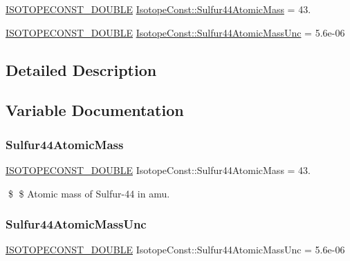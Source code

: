 \begin{DoxyCompactItemize}
\item 
\mbox{\hyperlink{group___isotope_const-_macros_ga8f45a7272ce02c0b4c65c44636ed719a}{I\+S\+O\+T\+O\+P\+E\+C\+O\+N\+S\+T\+\_\+\+D\+O\+U\+B\+LE}} \mbox{\hyperlink{group___isotope_const-_sulfur-_s44_ga752f3c0a12508d487f1f331ad47aec47}{Isotope\+Const\+::\+Sulfur44\+Atomic\+Mass}} = 43.
\item 
\mbox{\hyperlink{group___isotope_const-_macros_ga8f45a7272ce02c0b4c65c44636ed719a}{I\+S\+O\+T\+O\+P\+E\+C\+O\+N\+S\+T\+\_\+\+D\+O\+U\+B\+LE}} \mbox{\hyperlink{group___isotope_const-_sulfur-_s44_gabe445e37c9fd6b352b685fcfdad32e4a}{Isotope\+Const\+::\+Sulfur44\+Atomic\+Mass\+Unc}} = 5.\+6e-\/06
\end{DoxyCompactItemize}


\subsection{Detailed Description}


\subsection{Variable Documentation}
\mbox{\label{group___isotope_const-_sulfur-_s44_ga752f3c0a12508d487f1f331ad47aec47}} 
\subsubsection{\texorpdfstring{Sulfur44\+Atomic\+Mass}{Sulfur44AtomicMass}}
{\footnotesize\ttfamily \mbox{\hyperlink{group___isotope_const-_macros_ga8f45a7272ce02c0b4c65c44636ed719a}{I\+S\+O\+T\+O\+P\+E\+C\+O\+N\+S\+T\+\_\+\+D\+O\+U\+B\+LE}} Isotope\+Const\+::\+Sulfur44\+Atomic\+Mass = 43.}

\$ \$ Atomic mass of Sulfur-\/44 in amu. \mbox{\label{group___isotope_const-_sulfur-_s44_gabe445e37c9fd6b352b685fcfdad32e4a}} 
\subsubsection{\texorpdfstring{Sulfur44\+Atomic\+Mass\+Unc}{Sulfur44AtomicMassUnc}}
{\footnotesize\ttfamily \mbox{\hyperlink{group___isotope_const-_macros_ga8f45a7272ce02c0b4c65c44636ed719a}{I\+S\+O\+T\+O\+P\+E\+C\+O\+N\+S\+T\+\_\+\+D\+O\+U\+B\+LE}} Isotope\+Const\+::\+Sulfur44\+Atomic\+Mass\+Unc = 5.\+6e-\/06}

